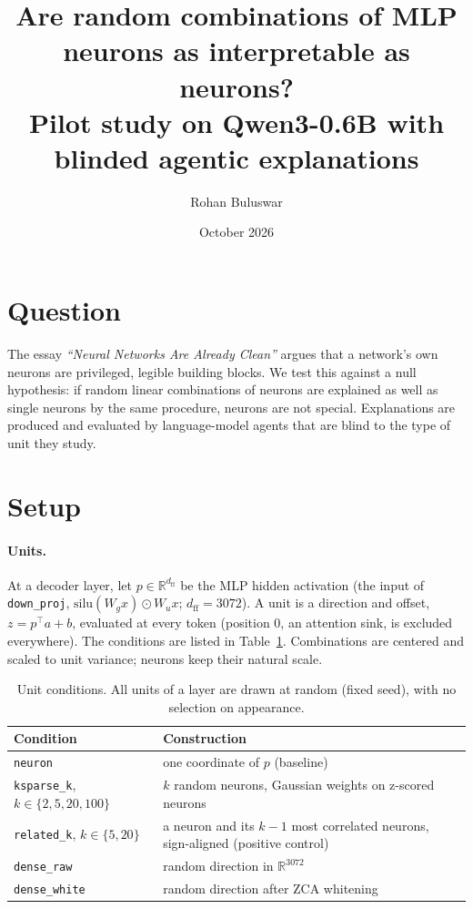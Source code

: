 \documentclass[11pt]{article}
\title{Are random combinations of MLP neurons as interpretable as neurons?\\
\large Pilot study on Qwen3-0.6B with blinded agentic explanations}
\author{Rohan Buluswar}
\date{October 2026}
\begin{document}
\maketitle

\section{Question}
The essay \emph{``Neural Networks Are Already Clean''} argues that a network's own neurons are privileged, legible
building blocks. We test this against a null hypothesis: if random linear combinations of neurons are explained as
well as single neurons by the same procedure, neurons are not special. Explanations are produced and evaluated by
language-model agents that are blind to the type of unit they study.

\section{Setup}

\paragraph{Units.} At a decoder layer, let $p \in \mathbb{R}^{d_{\mathrm{ff}}}$ be the MLP hidden activation (the
input of \texttt{down\_proj}, $\mathrm{silu}(W_g x)\odot W_u x$; $d_{\mathrm{ff}}=3072$). A unit is a direction and
offset, $z = p^\top a + b$, evaluated at every token (position 0, an attention sink, is excluded everywhere). The
conditions are listed in Table~\ref{tab:conditions}. Combinations are centered and scaled to unit variance; neurons
keep their natural scale.

\begin{table}[h]
\centering\small
\begin{tabular}{ll}
\toprule
Condition & Construction \\
\midrule
\texttt{neuron} & one coordinate of $p$ (baseline) \\
\texttt{ksparse\_k}, $k\in\{2,5,20,100\}$ & $k$ random neurons, Gaussian weights on z-scored neurons \\
\texttt{related\_k}, $k\in\{5,20\}$ & a neuron and its $k-1$ most correlated neurons, sign-aligned (positive control) \\
\texttt{dense\_raw} & random direction in $\mathbb{R}^{3072}$ \\
\texttt{dense\_white} & random direction after ZCA whitening \\
\bottomrule
\end{tabular}
\caption{Unit conditions. All units of a layer are drawn at random (fixed seed), with no selection on appearance.}
\label{tab:conditions}
\end{table}
\end{document}
